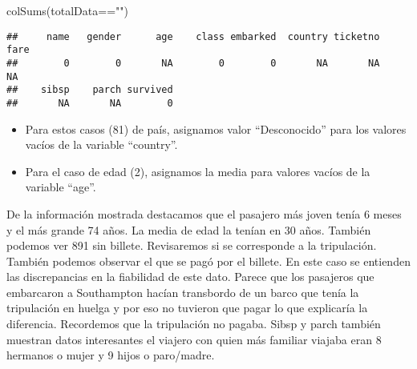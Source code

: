 \documentclass[
]{article}
\newenvironment{Shaded}{\begin{snugshade}}{\end{snugshade}}
\newcommand{\AttributeTok}[1]{\textcolor[rgb]{0.80,0.80,0.80}{#1}}
\newcommand{\FunctionTok}[1]{\textcolor[rgb]{0.94,0.94,0.56}{#1}}
\newcommand{\NormalTok}[1]{\textcolor[rgb]{0.80,0.80,0.80}{#1}}
\newcommand{\OtherTok}[1]{\textcolor[rgb]{0.94,0.94,0.56}{#1}}
\newcommand{\SpecialCharTok}[1]{\textcolor[rgb]{0.86,0.64,0.64}{#1}}
\newcommand{\StringTok}[1]{\textcolor[rgb]{0.80,0.58,0.58}{#1}}
\providecommand{\tightlist}{%
  \setlength{\itemsep}{0pt}\setlength{\parskip}{0pt}}
\begin{document}
\begin{Shaded}
\begin{Highlighting}[]
\FunctionTok{colSums}\NormalTok{(totalData}\SpecialCharTok{==}\StringTok{""}\NormalTok{)}
\end{Highlighting}
\end{Shaded}

\begin{verbatim}
##     name   gender      age    class embarked  country ticketno     fare 
##        0        0       NA        0        0       NA       NA       NA 
##    sibsp    parch survived 
##       NA       NA        0
\end{verbatim}

\begin{itemize}
\tightlist
\item
  Para estos casos (81) de país, asignamos valor ``Desconocido'' para
  los valores vacíos de la variable ``country''.
\end{itemize}

\begin{Shaded}
\end{Shaded}

\begin{itemize}
\tightlist
\item
  Para el caso de edad (2), asignamos la media para valores vacíos de la
  variable ``age''.
\end{itemize}

\begin{Shaded}
\end{Shaded}

De la información mostrada destacamos que el pasajero más joven tenía 6
meses y el más grande 74 años. La media de edad la tenían en 30 años.
También podemos ver 891 sin billete. Revisaremos si se corresponde a la
tripulación. También podemos observar el que se pagó por el billete. En
este caso se entienden las discrepancias en la fiabilidad de este dato.
Parece que los pasajeros que embarcaron a Southampton hacían transbordo
de un barco que tenía la tripulación en huelga y por eso no tuvieron que
pagar lo que explicaría la diferencia. Recordemos que la tripulación no
pagaba. Sibsp y parch también muestran datos interesantes el viajero con
quien más familiar viajaba eran 8 hermanos o mujer y 9 hijos o
paro/madre.
\end{document}
